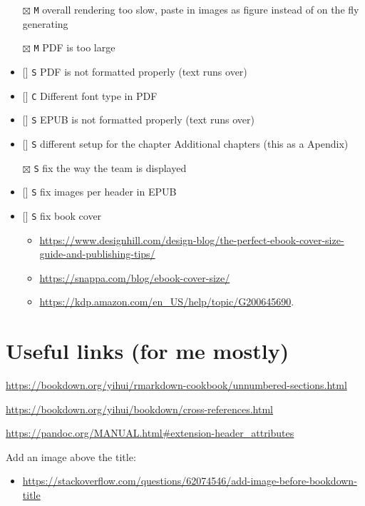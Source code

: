\documentclass[
]{book}
\newcommand{\passthrough}[1]{#1}
\providecommand{\tightlist}{%
  \setlength{\itemsep}{0pt}\setlength{\parskip}{0pt}}
\begin{document}
\begin{itemize}
\tightlist
\item[$\boxtimes$]
  \passthrough{\lstinline!M!} overall rendering too slow, paste in images as figure instead of on the fly generating
\item[$\boxtimes$]
  \passthrough{\lstinline!M!} PDF is too large
\item
  {[}{]} \passthrough{\lstinline!S!} PDF is not formatted properly (text runs over)
\item
  {[}{]} \passthrough{\lstinline!C!} Different font type in PDF
\item
  {[}{]} \passthrough{\lstinline!S!} EPUB is not formatted properly (text runs over)
\item
  {[}{]} \passthrough{\lstinline!S!} different setup for the chapter Additional chapters (this as a Apendix)
\item[$\boxtimes$]
  \passthrough{\lstinline!S!} fix the way the team is displayed
\item
  {[}{]} \passthrough{\lstinline!S!} fix images per header in EPUB
\item
  {[}{]} \passthrough{\lstinline!S!} fix book cover

  \begin{itemize}
  \tightlist
  \item
    \url{https://www.designhill.com/design-blog/the-perfect-ebook-cover-size-guide-and-publishing-tips/}
  \item
    \url{https://snappa.com/blog/ebook-cover-size/}
  \item
    \url{https://kdp.amazon.com/en_US/help/topic/G200645690}.
  \end{itemize}
\end{itemize}

\hypertarget{useful-links-for-me-mostly}{%
\section{Useful links (for me mostly)}\label{useful-links-for-me-mostly}}

\url{https://bookdown.org/yihui/rmarkdown-cookbook/unnumbered-sections.html}

\url{https://bookdown.org/yihui/bookdown/cross-references.html}

\url{https://pandoc.org/MANUAL.html\#extension-header_attributes}

Add an image above the title:

\begin{itemize}
\tightlist
\item
  \url{https://stackoverflow.com/questions/62074546/add-image-before-bookdown-title}
\end{itemize}
\end{document}
